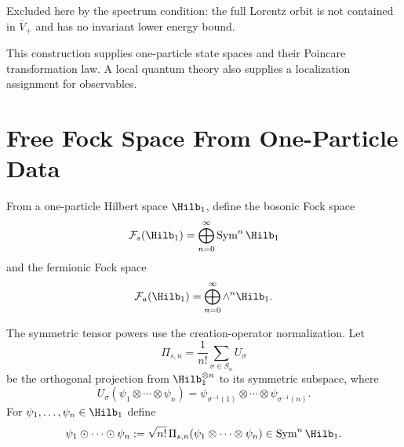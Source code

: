 \begin{table}[H]
\begin{tabular}
    Excluded here by the spectrum condition: the full Lorentz orbit is not
    contained in \(\overline V_+\) and has no invariant lower energy bound. \\
    \hline
  \end{tabular}
  \caption{Four-dimensional Wigner orbit classes for irreducible
  one-particle representations of the universal cover of the connected
  Poincare group.  A general Hilbert space representation may contain direct
  sums or direct integrals of such irreducibles; a stable particle species is
  an isolated copy of one of the particle orbits satisfying the spectral and
  localization hypotheses used later.}
  \label{tab:wigner-classification-four-dimensional}
\end{table}

This construction supplies one-particle state spaces and their Poincare
transformation law. A local quantum theory also supplies a localization
assignment for observables.

\section{Free Fock Space From One-Particle Data}

\begin{definition}
\label{def:free-bosonic-fermionic-fock-spaces}
From a one-particle Hilbert space \(\Hilb_1\), define the bosonic Fock space
\[
  \mathcal F_s(\Hilb_1)
  =
  \bigoplus_{n=0}^{\infty}\operatorname{Sym}^n\Hilb_1
\]
and the fermionic Fock space
\[
  \mathcal F_a(\Hilb_1)
  =
  \bigoplus_{n=0}^{\infty}\wedge^n\Hilb_1.
\]
\end{definition}

\begin{definition}
\label{def:bosonic-creation-operator-tensor-normalization}
The symmetric tensor powers use the creation-operator normalization.  Let
\[
  \Pi_{s,n}
  =
  \frac{1}{n!}
  \sum_{\sigma\in S_n}U_\sigma
\]
be the orthogonal projection from \(\Hilb_1^{\otimes n}\) to its symmetric
subspace, where
\[
  U_\sigma(\psi_1\otimes\cdots\otimes\psi_n)
  =
  \psi_{\sigma^{-1}(1)}\otimes\cdots\otimes\psi_{\sigma^{-1}(n)} .
\]
For \(\psi_1,\ldots,\psi_n\in\Hilb_1\) define
\begin{equation}
  \psi_1\odot\cdots\odot\psi_n
  :=
  \sqrt{n!}\,
  \Pi_{s,n}(\psi_1\otimes\cdots\otimes\psi_n)
  \in \operatorname{Sym}^n\Hilb_1 .
  \label{eq:bosonic-fock-odot-normalization}
\end{equation}
\end{definition}

